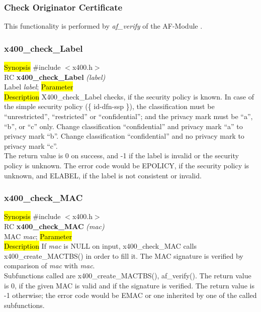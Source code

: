 \subsubsection{Check Originator Certificate}
\label{x4_check_ocert}

This functionality is performed by {\em af\_verify}
of the AF-Module
\speconly{(\ref{af_verify})}
.

\subsubsection{x400\_check\_Label}
\label{x4_ck_Lab}
\hl{Synopsis}
\#include $<$x400.h$>$ \\ [1ex]
RC {\bf x400\_check\_Label} {\em (label)} \\
Label {\em *label};
\hl{Parameter}
 \\[1ex]
\hl{Description}
X400\_check\_Label
checks, if the security policy is known.
In case of the simple security policy (\{ id-dfn-ssp \}),
the classification must be ``unrestricted'', ``restricted''
or ``confidential'';
and the privacy mark must be ``a'', ``b'', or ``c'' only.
Change classification ``confidential'' and privacy mark ``a''
to privacy mark ``b''.
Change classification ``confidential'' and no privacy mark
to privacy mark ``c''.
\\
The return value is 0 on success, and -1 if the label is invalid or the
security policy is unknown.
The error code would be EPOLICY, if the security policy is unknown,
and ELABEL, if the label is not consistent or invalid.

\subsubsection{x400\_check\_MAC}
\label{x4_ck_MAC}
\hl{Synopsis}
\#include $<$x400.h$>$ \\ [1ex]
RC {\bf x400\_check\_MAC} {\em (mac)} \\
MAC {\em *mac};
\hl{Parameter}
 \\[1ex]
\hl{Description}
If {\em mac} is NULL on input,
x400\_check\_MAC calls x400\_create\_MACTBS() in order to fill it.
The MAC signature is verified
by comparison of {\em mac}
with {\em mac}.
\\
Subfunctions called are x400\_create\_MACTBS(), af\_verify().
The return value is 0, if the given MAC is valid
and if the signature is  verified.
The return value is -1 otherwise;
the error code would be EMAC
or one inherited by one of the called subfunctions.


